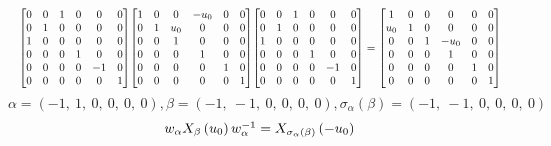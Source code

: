 \documentclass[11pt]{article}
\theoremstyle{definition}
\begin{document}
\[
\scaletoalign{\textwidth}{{\left[\begin{matrix}0 & 0 & 1 & 0 & 0 & 0\\0 & 1 & 0 & 0 & 0 & 0\\1 & 0 & 0 & 0 & 0 & 0\\0 & 0 & 0 & 1 & 0 & 0\\0 & 0 & 0 & 0 & -1 & 0\\0 & 0 & 0 & 0 & 0 & 1\end{matrix}\right]} {\left[\begin{matrix}1 & 0 & 0 & - u_{0} & 0 & 0\\0 & 1 & u_{0} & 0 & 0 & 0\\0 & 0 & 1 & 0 & 0 & 0\\0 & 0 & 0 & 1 & 0 & 0\\0 & 0 & 0 & 0 & 1 & 0\\0 & 0 & 0 & 0 & 0 & 1\end{matrix}\right]} {\left[\begin{matrix}0 & 0 & 1 & 0 & 0 & 0\\0 & 1 & 0 & 0 & 0 & 0\\1 & 0 & 0 & 0 & 0 & 0\\0 & 0 & 0 & 1 & 0 & 0\\0 & 0 & 0 & 0 & -1 & 0\\0 & 0 & 0 & 0 & 0 & 1\end{matrix}\right]} = {\left[\begin{matrix}1 & 0 & 0 & 0 & 0 & 0\\u_{0} & 1 & 0 & 0 & 0 & 0\\0 & 0 & 1 & - u_{0} & 0 & 0\\0 & 0 & 0 & 1 & 0 & 0\\0 & 0 & 0 & 0 & 1 & 0\\0 & 0 & 0 & 0 & 0 & 1\end{matrix}\right]}}
\]
\[
\alpha = \left( -1, \  1, \  0, \  0, \  0, \  0\right), \beta = \left( -1, \  -1, \  0, \  0, \  0, \  0\right), \sigma_{\alpha}(\beta) = \left( -1, \  -1, \  0, \  0, \  0, \  0\right)
\]
\[
\scaletoalign{\textwidth}{w_{\alpha} X_{\beta}\left(u_{0}\right) w_{\alpha}^{-1} = X_{\sigma_{\alpha}\left(\beta\right)}\left(- u_{0}\right)}
\]
\end{document}
